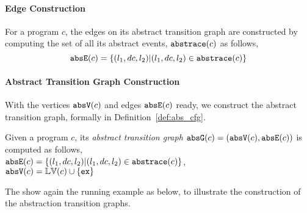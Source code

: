  \paragraph{Edge Construction}
For a program $c$, the edges on its abstract transition graph are constructed by computing the set of all its abstract events, $\mathtt{abs}{\mathtt{trace}}(c)$ as follows,
 \[
 \mathtt{abs}{\mathtt{E}}(c) = \{(l_1, dc, l_2) | (l_1, dc, l_2) \in \mathtt{abs}{\mathtt{trace}}(c)\}
 \]
\paragraph{Abstract Transition Graph Construction} 
With the vertices $\mathtt{abs}{\mathtt{V}}(c)$ and edges $\mathtt{abs}{\mathtt{E}}(c)$ ready, we construct the abstract transition graph, formally in
Definition~\ref{def:abs_cfg}.
%
\begin{defn}
\label{def:abs_cfg}
Given a program $c$, 
its \emph{abstract transition graph} $\mathtt{abs}{\mathtt{G}}(c) =(\mathtt{abs}{\mathtt{V}}(c), \mathtt{abs}{\mathtt{E}}(c))$ is computed as follows,
\\
$\mathtt{abs}{\mathtt{E}}(c) = \{(l_1, dc, l_2) | (l_1, dc, l_2) \in \mathtt{abs}{\mathtt{trace}}(c)\}$,
\\
$\mathtt{abs}{\mathtt{V}}(c) = \mathbb{LV}(c)\cup\{\mathtt{ex}\}$
\end{defn}


The show again the running example as below, to illustrate the construction of the abstraction transition graphs.
%
